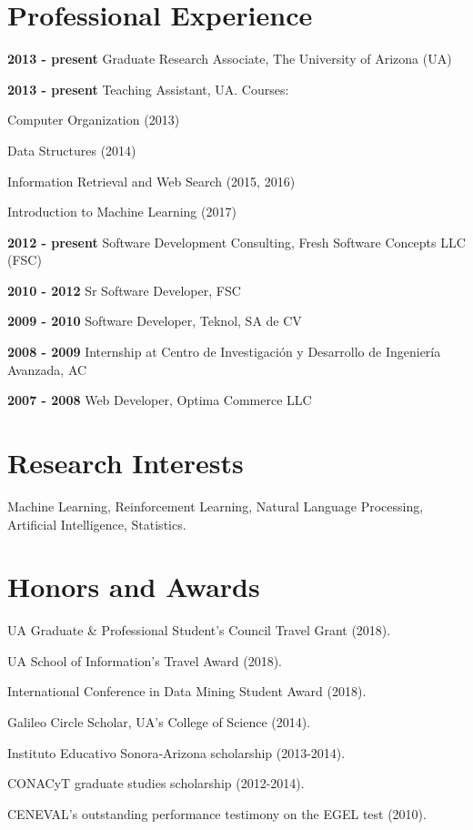\documentclass[letterpaper]{article}
\renewenvironment{itemize}{
  \begin{list}{}{
    \setlength{\leftmargin}{1.5em}
  }
}{
  \end{list}
}
\begin{document}
\section*{Professional Experience}

\begin{itemize}
\item \textbf{2013 - present} Graduate Research Associate, The University of Arizona (UA)
\item \textbf{2013 - present} Teaching Assistant, UA. Courses:
\item \begin{itemize}
	\item Computer Organization (2013)
	\item Data Structures (2014)
	\item Information Retrieval and Web Search (2015, 2016)
	\item Introduction to Machine Learning (2017)
\end{itemize}
\item \textbf{2012 - present} Software Development Consulting, Fresh Software Concepts LLC (FSC)
\item \textbf{2010 - 2012} Sr Software Developer, FSC
\item \textbf{2009 - 2010} Software Developer, Teknol, SA de CV
\item \textbf{2008 - 2009} Internship at {\small Centro de Investigaci\'{o}n y Desarrollo de Ingenier\'{i}a Avanzada, AC}
\item \textbf{2007 - 2008} Web Developer, Optima Commerce LLC
\end{itemize}

\section*{Research Interests}
Machine Learning, Reinforcement Learning, Natural Language Processing, Artificial Intelligence, Statistics.

\section*{Honors and Awards}
\begin{itemize}
	\item UA Graduate \& Professional Student's Council Travel Grant (2018).
	\item UA School of Information's Travel Award (2018).
	\item International Conference in Data Mining Student Award (2018).
	\item Galileo Circle Scholar, UA's College of Science (2014).
	\item Instituto Educativo Sonora-Arizona scholarship (2013-2014).
	\item CONACyT graduate studies scholarship (2012-2014).
	\item CENEVAL's outstanding performance testimony on the EGEL test (2010). 
\end{itemize}
\end{document}
